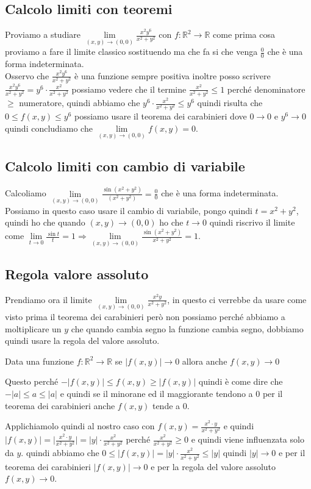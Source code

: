 \subsection{Calcolo limiti con teoremi}
Proviamo a studiare $\lim\limits_{(x,y)\to (0,0)}\frac{x^2 y^6}{x^2 + y^2}$ con $f: \mathbb{R}^2 \to \mathbb{R}$ come prima cosa proviamo a fare il limite classico sostituendo ma che fa si che venga $\frac{0}{0}$ che è una forma indeterminata.\\
Osservo che $\frac{x^2 y^6}{x^2 + y^2}$ è una funzione sempre positiva inoltre posso scrivere $\frac{x^2 y^6}{x^2 + y^2} = y^6 \cdot \frac{x^2}{x^2 + y^2}$ possiamo vedere che il termine $\frac{x^2}{x^2 + y^2} \leq 1$ perché denominatore $\geq$ numeratore, quindi abbiamo che $y^6 \cdot \frac{x^2}{x^2 + y^2} \leq y^6$ quindi risulta che $0 \leq f(x,y) \leq y^6$ possiamo usare il teorema dei carabinieri dove $0 \to 0$ e $y^6 \to 0$ quindi concludiamo che $\lim\limits_{(x,y)\to (0,0)}f(x,y) = 0$.

\subsection{Calcolo limiti con cambio di variabile}
Calcoliamo $\lim\limits_{(x,y) \to (0,0)}\frac{\sin(x^2 + y^2)}{(x^2 + y^2)} = \frac{0}{0}$ che è una forma indeterminata. Possiamo in questo caso usare il cambio di variabile, pongo quindi $t = x^2 + y^2$, quindi ho che quando $(x,y)\to (0,0)$ ho che $t \to 0$ quindi riscrivo il limite come $\lim\limits_{t\to 0}\frac{\sin{t}}{t} = 1 \Longrightarrow \lim\limits_{(x,y)\to (0,0)} \frac{\sin(x^2+y^2)}{x^2+y^2} = 1$.

\subsection{Regola valore assoluto}
Prendiamo ora il limite $\lim\limits_{(x,y)\to (0,0)}\frac{x^2y}{x^2 + y^2}$, in questo ci verrebbe da usare come visto prima il teorema dei carabinieri però non possiamo perché abbiamo a moltiplicare un $y$ che quando cambia segno la funzione cambia segno, dobbiamo quindi usare la regola del valore assoluto.
\begin{proposition}
Data una funzione $f: \mathbb{R}^2 \to \mathbb{R}$ se $|f(x,y)| \to 0$ allora anche $f(x,y) \to 0$
\end{proposition}
\begin{demostration}
Questo perché $-|f(x,y)| \leq f(x,y) \geq |f(x,y)|$ quindi è come dire che $-|a| \leq a \leq |a|$ e quindi se il minorane ed il maggiorante tendono a 0 per il teorema dei carabinieri anche $f(x,y)$ tende a 0.
\end{demostration}
\vspace{-5pt}
\hspace{-15pt}Applichiamolo quindi al nostro caso con $f(x,y) = \frac{x^2 \cdot y}{x^2 + y^2}$ e quindi $|f(x,y)| = \bigg| \frac{x^2 \cdot y}{x^2 + y^2} \bigg| = |y| \cdot \frac{x^2}{x^2 + y^2}$ perché $\frac{x^2}{x^2 + y^2} \geq 0$ e quindi viene influenzata solo da $y$. quindi abbiamo che $0 \leq |f(x,y)| = |y| \cdot \frac{x^2}{x^2+y^2} \leq |y|$ quindi $|y| \to 0$ e per il teorema dei carabinieri $|f(x,y)| \to 0$ e per la regola del valore assoluto $f(x,y) \to 0$.

